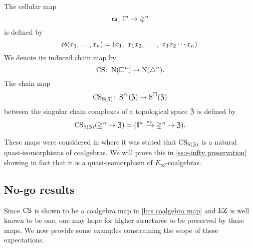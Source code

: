 The cellular map
\[
\operatorname{\mathfrak{cs}} \colon \mathbb{I}^n \to \mathbb{\Delta}^n
\]
is defined by
\[
\operatorname{\mathfrak{cs}}(x_1, \dots, x_n) =
(x_1,\ x_1 x_2, \, \dots \, , \ x_1 x_2 \dotsm x_n).
\]
We denote its induced chain map by
\[
\operatorname{CS} \colon \operatorname{N}(\square^n) \to \operatorname{N}(\triangle^n).
\]
The chain map
\[
\operatorname{CS}_{\operatorname{S}(\mathfrak{Z})} \colon \operatorname{\operatorname{S}^{\triangle}}(\mathfrak{Z}) \to \operatorname{\operatorname{S}^{\square}}(\mathfrak{Z})
\]
between the singular chain complexes of a topological space $\mathfrak{Z}$ is defined by
\[
\operatorname{CS}_{\operatorname{S}(\mathfrak{Z})} (\mathbb{\Delta}^n \to \mathfrak{Z}) =
(\mathbb{I}^n \xrightarrow{\operatorname{\mathfrak{cs}}} \mathbb{\Delta}^n \to \mathfrak{Z}).
\]

These maps were considered in \cite[p. 442]{serre1951homologie} where it was stated that $\operatorname{CS}_{\operatorname{S}(\mathfrak{Z})}$ is a natural quasi-isomorphisms of coalgebras.
We will prove this in \cref{ss:e-infty preservation} showing in fact that it is a quasi-isomorphism of $E_\infty$-coalgebras.

\subsection{No-go results}

Since $\operatorname{CS}$ is shown to be a coalgebra map in \cref{l:cs coalgebra map} and $\operatorname{EZ}$ is well known to be one, one may hope for higher structures to be preserved by these maps.
We now provide some examples constraining the scope of these expectations.

